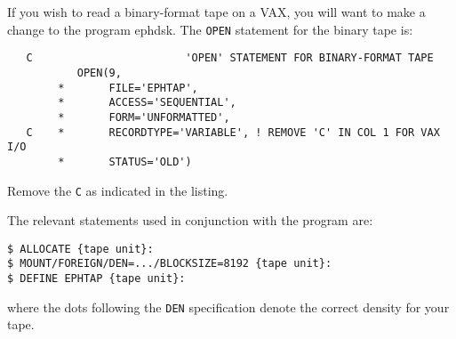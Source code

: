 If you wish to read a binary-format tape on a VAX, you will want to
make a change to the program {\csc ephdsk}. The {\tt OPEN} statement
for the binary tape is:
\begin{verbatim}
   C                        'OPEN' STATEMENT FOR BINARY-FORMAT TAPE
           OPEN(9,
        *       FILE='EPHTAP',
        *       ACCESS='SEQUENTIAL',
        *       FORM='UNFORMATTED',
   C    *       RECORDTYPE='VARIABLE', ! REMOVE 'C' IN COL 1 FOR VAX I/O
        *       STATUS='OLD')
\end{verbatim}
Remove the {\tt C} as indicated in the listing.
 
The relevant statements used in conjunction with the program are:
\begin{verbatim}
$ ALLOCATE {tape unit}:
$ MOUNT/FOREIGN/DEN=.../BLOCKSIZE=8192 {tape unit}:
$ DEFINE EPHTAP {tape unit}:
\end{verbatim}
where the dots following the {\tt DEN} specification denote the correct
density for your tape.



